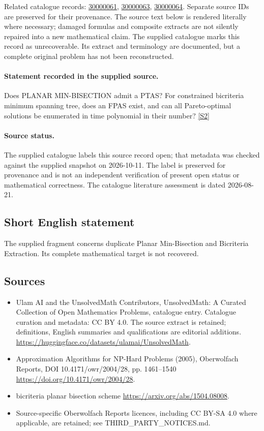 \documentclass[11pt]{article}
\newcommand{\sref}[2]{\hyperlink{source:#1:#2}{[S#2]}}
\begin{document}
Related catalogue records: \href{https://mehmetmars7.github.io/Erdosproblems-llm-hunter/problem.html?type=open_problems&id=30000061}{30000061}, \href{https://mehmetmars7.github.io/Erdosproblems-llm-hunter/problem.html?type=open_problems&id=30000063}{30000063}, \href{https://mehmetmars7.github.io/Erdosproblems-llm-hunter/problem.html?type=open_problems&id=30000064}{30000064}. Separate source IDs are preserved for their provenance.
The source text below is rendered literally where necessary; damaged formulas and composite extracts are not silently repaired into a new mathematical claim.
The supplied catalogue marks this record as unrecoverable. Its extract and terminology are documented, but a complete original problem has not been reconstructed.
\paragraph{Statement recorded in the supplied source.}
Does PLANAR MIN-BISECTION admit a PTAS? For constrained bicriteria minimum spanning tree, does an FPAS exist, and can all Pareto-optimal solutions be enumerated in time polynomial in their number? \sref{statement}{2}
\paragraph{Source status.}
The supplied catalogue labels this source record open; that metadata was checked against the supplied snapshot on 2026-10-11. The label is preserved for provenance and is not an independent verification of present open status or mathematical correctness. The catalogue literature assessment is dated 2026-08-21.
\subsection{Short English statement}
The supplied fragment concerns duplicate Planar Min-Bisection and Bicriteria Extraction. Its complete mathematical target is not recovered.
\subsection{Sources}
\begin{itemize}
\item[\hypertarget{source:statement:1}{S1}] Ulam AI and the UnsolvedMath Contributors, UnsolvedMath: A Curated Collection of Open Mathematics Problems, catalogue entry. Catalogue curation and metadata: CC BY 4.0. The source extract is retained; definitions, English summaries and qualifications are editorial additions.
\url{https://huggingface.co/datasets/ulamai/UnsolvedMath}.
\item[\hypertarget{source:statement:2}{S2}] Approximation Algorithms for NP-Hard Problems (2005), Oberwolfach Reports, DOI 10.4171/owr/2004/28, pp. 1461--1540
\url{https://doi.org/10.4171/owr/2004/28}.
\item[\hypertarget{source:statement:3}{S3}] bicriteria planar bisection scheme
\url{https://arxiv.org/abs/1504.08008}.
\item Source-specific Oberwolfach Reports licences, including CC BY-SA 4.0 where applicable, are retained; see THIRD\_PARTY\_NOTICES.md.
\end{itemize}
\end{document}
